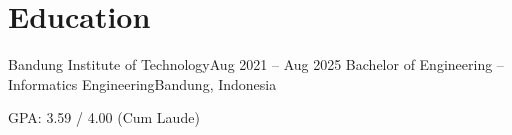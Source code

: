 \section{Education}
  \resumeSubHeadingListStart
    \resumeSubheading
      {Bandung Institute of Technology}{Aug 2021 -- Aug 2025}
      {Bachelor of Engineering -- Informatics Engineering}{Bandung, Indonesia}
    
    \vspace{1mm}
    {\small GPA: 3.59 / 4.00 (Cum Laude)}

  \resumeSubHeadingListEnd
